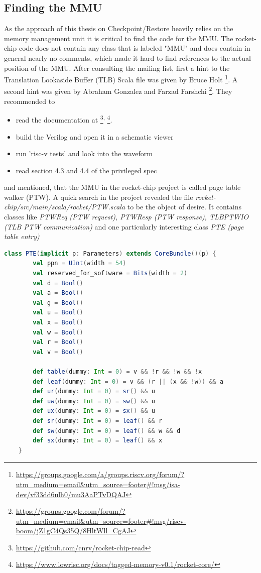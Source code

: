 \subsection{Finding the MMU}
As the approach of this thesis on Checkpoint/Restore heavily relies on the memory
management unit it is critical to find the code for the MMU.
The rocket-chip code does not contain any class that is labeled "MMU" and does contain
in general nearly no comments, which made it hard to find references to the actual
position of the MMU.
After consulting the mailing list, first a hint to the Translation Lookaside Buffer (TLB)
Scala file was given by Bruce Holt
\footnote{\url{https://groups.google.com/a/groups.riscv.org/forum/?utm_medium=email&utm_source=footer\#!msg/isa-dev/vf33dd6ulh0/mu3AaPTvDQAJ}}.
A second hint was given by Abraham Gonzalez and Farzad Farshchi
\footnote{\url{https://groups.google.com/forum/?utm_medium=email&utm_source=footer\#!msg/riscv-boom/jZ1gC4Qs35Q/8HltWll_CgAJ}}.
They recommended to
\begin{itemize}
    \item read the documentation at
    \footnote{\url{https://github.com/cnrv/rocket-chip-read}}\textsuperscript{,}
    \footnote{\url{https://www.lowrisc.org/docs/tagged-memory-v0.1/rocket-core/}}.
     \item build the Verilog and open it in a schematic viewer
     \item run 'risc-v tests' and look into the waveform
     \item read section 4.3 and 4.4 of the privileged spec
\end{itemize}
and mentioned, that the MMU in the rocket-chip project is called page table
walker (PTW). A quick search in the project revealed the file
\textit{rocket-chip/src/main/scala/rocket/PTW.scala} to be the object of desire.
It contains classes like 
\textit{PTWReq (PTW request), PTWResp (PTW response), TLBPTWIO (TLB PTW communication)}
and one particularly interesting class \textit{PTE (page table entry)}
\begin{lstlisting}[language=scala, frame=single]
    class PTE(implicit p: Parameters) extends CoreBundle()(p) {
        val ppn = UInt(width = 54)
        val reserved_for_software = Bits(width = 2)
        val d = Bool()
        val a = Bool()
        val g = Bool()
        val u = Bool()
        val x = Bool()
        val w = Bool()
        val r = Bool()
        val v = Bool()
        
        def table(dummy: Int = 0) = v && !r && !w && !x
        def leaf(dummy: Int = 0) = v && (r || (x && !w)) && a
        def ur(dummy: Int = 0) = sr() && u
        def uw(dummy: Int = 0) = sw() && u
        def ux(dummy: Int = 0) = sx() && u
        def sr(dummy: Int = 0) = leaf() && r
        def sw(dummy: Int = 0) = leaf() && w && d
        def sx(dummy: Int = 0) = leaf() && x
    }
\end{lstlisting}
